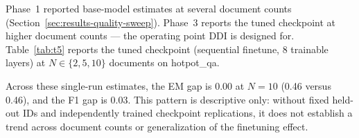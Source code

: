 Phase~1 reported base-model estimates at several document counts
(Section~\ref{sec:results-quality-sweep}). Phase~3 reports the tuned
checkpoint at higher document counts --- the operating point DDI is designed
for. Table~\ref{tab:t5} reports the tuned
checkpoint (sequential finetune, 8 trainable layers) at $N \in \{2, 5, 10\}$
documents on hotpot\_qa.

\begin{table}[t]
\centering\small
\caption{T5 --- quality versus document count on the tuned checkpoint,
    hotpot\_qa, 100 records per cell. Each cell is a single-run estimate from
    one checkpoint lineage; no comparison confidence interval is available.}
\label{tab:t5}
\end{table}

Across these single-run estimates, the EM gap is 0.00 at $N{=}10$
(0.46 versus 0.46), and the F1 gap is 0.03. This pattern is descriptive only:
without fixed held-out IDs and independently trained checkpoint replications,
it does not establish a trend across document counts or generalization of the
finetuning effect.
